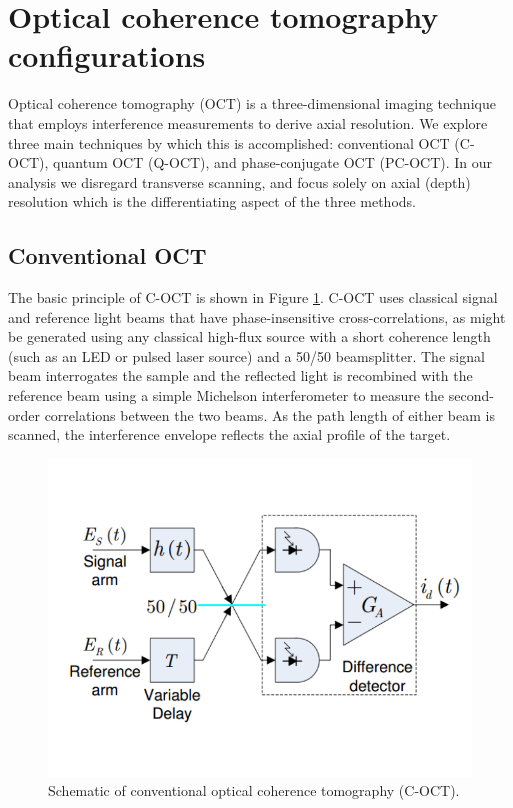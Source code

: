 \section{Optical coherence tomography configurations}

Optical coherence tomography (OCT) is a three-dimensional imaging technique that employs interference measurements to derive axial resolution. We explore three main techniques by which this is accomplished: conventional OCT (C-OCT), quantum OCT (Q-OCT), and phase-conjugate OCT (PC-OCT). In our analysis we disregard transverse scanning, and focus solely on axial (depth) resolution which is the differentiating aspect of the three methods.

\subsection{Conventional OCT}

The basic principle of C-OCT is shown in Figure \ref{figure:pcoct-schematic-coct}. C-OCT uses classical signal and reference light beams that have phase-insensitive cross-correlations, as might be generated using any classical high-flux source with a short coherence length (such as an LED or pulsed laser source) and a 50/50 beamsplitter. The signal beam interrogates the sample and the reflected light is recombined with the reference beam using a simple Michelson interferometer to measure the second-order correlations between the two beams. As the path length of either beam is scanned, the interference envelope reflects the axial profile of the target.

\begin{figure}[t]
\begin{center}
\includegraphics[width=13cm]{figure-pcoct-schematic-coct.pdf}
\caption{Schematic of conventional optical coherence tomography (C-OCT).}
\label{figure:pcoct-schematic-coct}
\end{center}
\end{figure}

